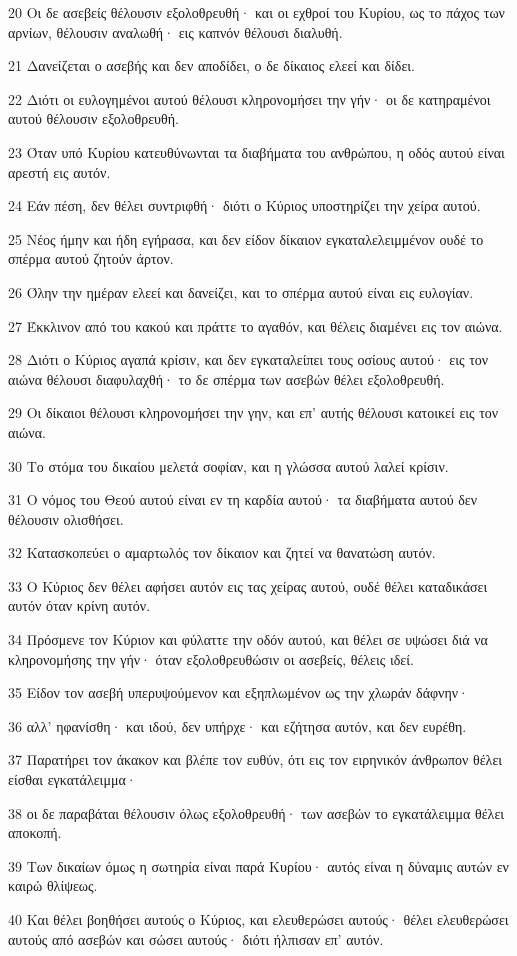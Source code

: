 \par 20 Οι δε ασεβείς θέλουσιν εξολοθρευθή· και οι εχθροί του Κυρίου, ως το πάχος των αρνίων, θέλουσιν αναλωθή· εις καπνόν θέλουσι διαλυθή.
\par 21 Δανείζεται ο ασεβής και δεν αποδίδει, ο δε δίκαιος ελεεί και δίδει.
\par 22 Διότι οι ευλογημένοι αυτού θέλουσι κληρονομήσει την γήν· οι δε κατηραμένοι αυτού θέλουσιν εξολοθρευθή.
\par 23 Όταν υπό Κυρίου κατευθύνωνται τα διαβήματα του ανθρώπου, η οδός αυτού είναι αρεστή εις αυτόν.
\par 24 Εάν πέση, δεν θέλει συντριφθή· διότι ο Κύριος υποστηρίζει την χείρα αυτού.
\par 25 Νέος ήμην και ήδη εγήρασα, και δεν είδον δίκαιον εγκαταλελειμμένον ουδέ το σπέρμα αυτού ζητούν άρτον.
\par 26 Όλην την ημέραν ελεεί και δανείζει, και το σπέρμα αυτού είναι εις ευλογίαν.
\par 27 Έκκλινον από του κακού και πράττε το αγαθόν, και θέλεις διαμένει εις τον αιώνα.
\par 28 Διότι ο Κύριος αγαπά κρίσιν, και δεν εγκαταλείπει τους οσίους αυτού· εις τον αιώνα θέλουσι διαφυλαχθή· το δε σπέρμα των ασεβών θέλει εξολοθρευθή.
\par 29 Οι δίκαιοι θέλουσι κληρονομήσει την γην, και επ' αυτής θέλουσι κατοικεί εις τον αιώνα.
\par 30 Το στόμα του δικαίου μελετά σοφίαν, και η γλώσσα αυτού λαλεί κρίσιν.
\par 31 Ο νόμος του Θεού αυτού είναι εν τη καρδία αυτού· τα διαβήματα αυτού δεν θέλουσιν ολισθήσει.
\par 32 Κατασκοπεύει ο αμαρτωλός τον δίκαιον και ζητεί να θανατώση αυτόν.
\par 33 Ο Κύριος δεν θέλει αφήσει αυτόν εις τας χείρας αυτού, ουδέ θέλει καταδικάσει αυτόν όταν κρίνη αυτόν.
\par 34 Πρόσμενε τον Κύριον και φύλαττε την οδόν αυτού, και θέλει σε υψώσει διά να κληρονομήσης την γήν· όταν εξολοθρευθώσιν οι ασεβείς, θέλεις ιδεί.
\par 35 Είδον τον ασεβή υπερυψούμενον και εξηπλωμένον ως την χλωράν δάφνην·
\par 36 αλλ' ηφανίσθη· και ιδού, δεν υπήρχε· και εζήτησα αυτόν, και δεν ευρέθη.
\par 37 Παρατήρει τον άκακον και βλέπε τον ευθύν, ότι εις τον ειρηνικόν άνθρωπον θέλει είσθαι εγκατάλειμμα·
\par 38 οι δε παραβάται θέλουσιν όλως εξολοθρευθή· των ασεβών το εγκατάλειμμα θέλει αποκοπή.
\par 39 Των δικαίων όμως η σωτηρία είναι παρά Κυρίου· αυτός είναι η δύναμις αυτών εν καιρώ θλίψεως.
\par 40 Και θέλει βοηθήσει αυτούς ο Κύριος, και ελευθερώσει αυτούς· θέλει ελευθερώσει αυτούς από ασεβών και σώσει αυτούς· διότι ήλπισαν επ' αυτόν.

